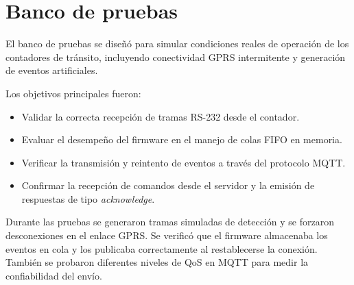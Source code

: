 \section{Banco de pruebas}
\label{sec:banco-pruebas}

El banco de pruebas se diseñó para simular condiciones reales de operación de los contadores de tránsito, 
incluyendo conectividad GPRS intermitente y generación de eventos artificiales.  


Los objetivos principales fueron:  
\begin{itemize}
    \item Validar la correcta recepción de tramas RS-232 desde el contador.
    \item Evaluar el desempeño del firmware en el manejo de colas FIFO en memoria.
    \item Verificar la transmisión y reintento de eventos a través del protocolo MQTT.
    \item Confirmar la recepción de comandos desde el servidor y la emisión de respuestas de tipo \textit{acknowledge}.
\end{itemize}

Durante las pruebas se generaron tramas simuladas de detección y se forzaron desconexiones en el enlace GPRS. 
Se verificó que el firmware almacenaba los eventos en cola y los publicaba correctamente al restablecerse la conexión. 
También se probaron diferentes niveles de QoS en MQTT para medir la confiabilidad del envío.  


